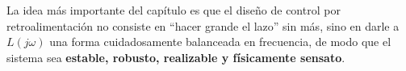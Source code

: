 La idea más importante del capítulo es que el diseño de control por retroalimentación no consiste en “hacer grande el lazo” sin más, sino en darle a \(L(j\omega)\) una forma cuidadosamente balanceada en frecuencia, de modo que el sistema sea \textbf{estable, robusto, realizable y físicamente sensato}.

